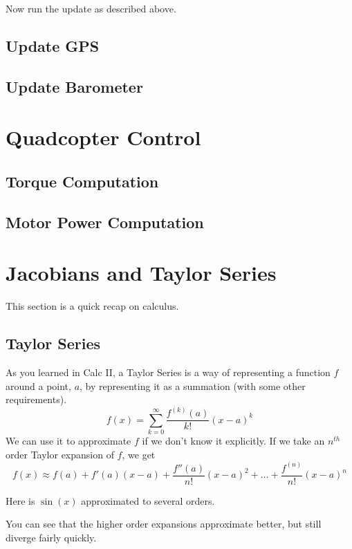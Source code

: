 \documentclass[11pt]{article}
\begin{document}
	Now run the update as described above.
	

\subsection{Update GPS}
\subsection{Update Barometer}

\section{Quadcopter Control}
\subsection{Torque Computation}

\subsection{Motor Power Computation}

\appendix
\section{Jacobians and Taylor Series}
This section is a quick recap on calculus.
\subsection{Taylor Series}
As you learned in Calc II, a Taylor Series is a way of representing a function $f$ around a point, $a$, by representing it as a summation (with some other requirements).
$$f(x) = \sum_{k=0}^\infty \frac{f^{(k)}(a)}{k!}(x-a)^k$$
We can use it to approximate $f$ if we don't know it explicitly. If we take an $n^{th}$ order Taylor expansion of $f$, we get 
$$f(x) \approx f(a) + f'(a)(x-a) + \frac{f''(a)}{n!}(x-a)^2 + \dots + \frac{f^{(n)}}{n!}(x-a)^n$$

Here is $\sin(x)$ approximated to several orders.
\begin{center}
\end{center}
You can see that the higher order expansions approximate better, but still diverge fairly quickly.
\end{document}
